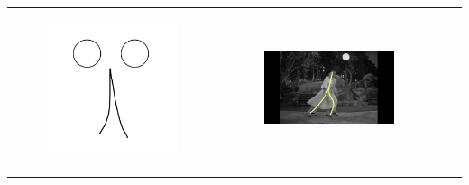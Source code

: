 \begin{table}[!htb]
\begin{tabular}{cccc}
\begin{subfigure}{0.2\textwidth}\centering\includegraphics[scale=0.1]{img/02keyframe}\end{subfigure}&
\begin{subfigure}{0.23\textwidth}\centering\includegraphics[scale=0.08]{img/keyframe_case_2_(2)}\end{subfigure}\\
\quad

\end{tabular}
\end{table}
